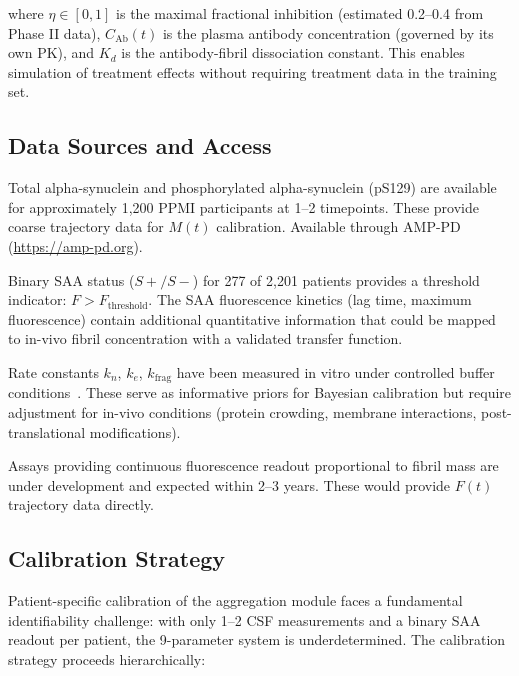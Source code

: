where $\eta \in [0, 1]$ is the maximal fractional inhibition (estimated 0.2--0.4 from Phase II data), $C_\text{Ab}(t)$ is the plasma antibody concentration (governed by its own PK), and $K_d$ is the antibody-fibril dissociation constant. This enables simulation of treatment effects without requiring treatment data in the training set.

\subsection{Data Sources and Access}

\begin{description}[style=nextline]
\item[CSF Alpha-Synuclein (PPMI)] Total alpha-synuclein and phosphorylated alpha-synuclein (pS129) are available for approximately 1,200 PPMI participants at 1--2 timepoints. These provide coarse trajectory data for $M(t)$ calibration. Available through AMP-PD (\url{https://amp-pd.org}).

\item[SAA Qualitative Results (PPMI)] Binary SAA status ($S+/S-$) for 277 of 2,201 patients provides a threshold indicator: $F > F_\text{threshold}$. The SAA fluorescence kinetics (lag time, maximum fluorescence) contain additional quantitative information that could be mapped to in-vivo fibril concentration with a validated transfer function.

\item[In Vitro Kinetic Data] Rate constants $k_n$, $k_e$, $k_\text{frag}$ have been measured in vitro under controlled buffer conditions~\cite{knowles2009,dear2020}. These serve as informative priors for Bayesian calibration but require adjustment for in-vivo conditions (protein crowding, membrane interactions, post-translational modifications).

\item[Next-Generation Quantitative SAA] Assays providing continuous fluorescence readout proportional to fibril mass are under development and expected within 2--3 years. These would provide $F(t)$ trajectory data directly.
\end{description}

\subsection{Calibration Strategy}

Patient-specific calibration of the aggregation module faces a fundamental identifiability challenge: with only 1--2 CSF measurements and a binary SAA readout per patient, the 9-parameter system is underdetermined. The calibration strategy proceeds hierarchically:

